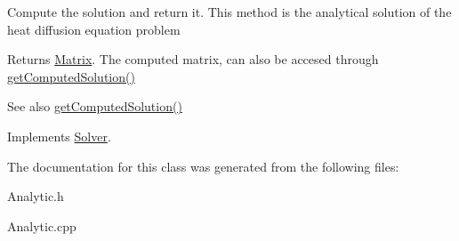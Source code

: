 Compute the solution and return it. This method is the analytical solution of the heat diffusion equation problem \begin{DoxyReturn}{Returns}
\mbox{\hyperlink{classMatrix}{Matrix}}. The computed matrix, can also be accesed through \mbox{\hyperlink{classSolver_aafe88ce4130c001052e5d93c1681f90f}{get\+Computed\+Solution()}} 
\end{DoxyReturn}
\begin{DoxySeeAlso}{See also}
\mbox{\hyperlink{classSolver_aafe88ce4130c001052e5d93c1681f90f}{get\+Computed\+Solution()}} 
\end{DoxySeeAlso}


Implements \mbox{\hyperlink{classSolver_a0f4ecfaed825407019995b5176e25748}{Solver}}.



The documentation for this class was generated from the following files\+:\begin{DoxyCompactItemize}
\item 
Analytic.\+h\item 
Analytic.\+cpp\end{DoxyCompactItemize}
